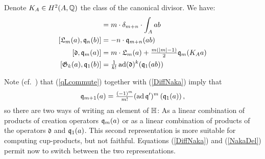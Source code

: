 \begin{lemma}\cite[Thm.~2.16]{LiQinWang} Denote $K_A\in H^2(A,\mathbb{Q})$ the class of the canonical divisor. We have:
\label{commutators}
\begin{align}
[\q_m(a), \q_n(b)] &= m\cdot \delta_{m+n} \cdot \int_A ab \\
\label{qLcommute}
[\mathfrak{L}_m(a),\q_n(b)] &= -n\cdot \q_{m+n}(ab) \\
\label{DiffNaka}
[\mathfrak{d},\q_m(a)] &= m \cdot \mathfrak{L}_m(a) + \tfrac{m(|m|-1)}{2} \q_m(K_A a) \\
[\G_k(a),\q_1(b)] &= \tfrac{1}{k!} \ad(\mathfrak{d})^k(\q_1(a b) ) 
\end{align}
\end{lemma}
\begin{remark}\label{HRep}
Note (cf.~\cite[Thm.~3.8]{LehnSorger}) that (\ref{qLcommute}) together with (\ref{DiffNaka}) imply that 
\begin{equation}\label{NakaDel}
\mathfrak{q}_{m+1}(a) = \tfrac{(-1)^m}{m!}(\operatorname{ad}\mathfrak{q}')^m\left(\mathfrak{q}_1(a)\right),
\end{equation}
so there are two ways of writing an element of $\mathbb{H}$: As a linear combination of products of creation operators $\mathfrak{q}_m(a)$ or as a linear combination of products of the operators $\mathfrak{d}$ and $\mathfrak{q}_1(a)$. This second representation is more suitable for computing cup-products, but not faithful. 
Equations (\ref{DiffNaka}) and (\ref{NakaDel}) permit now to switch between the two representations.
\end{remark}

